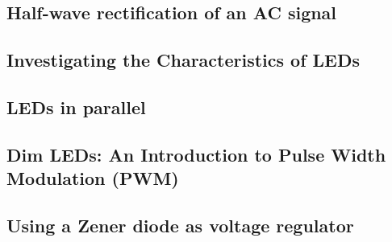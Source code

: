 \documentclass[12pt]{article}
\begin{document}

\subsection{Half-wave rectification of an AC signal}


\subsection{Investigating the Characteristics of LEDs}


\subsection{LEDs in parallel}


\subsection{Dim LEDs: An Introduction to Pulse Width Modulation (PWM)}


\subsection{Using a Zener diode as voltage regulator}

\end{document}
